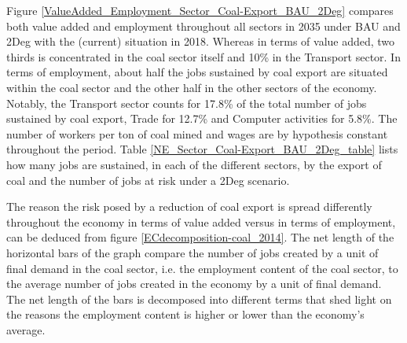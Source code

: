 \documentclass[12pt,english]{article}
\begin{document}

Figure \ref{ValueAdded_Employment_Sector_Coal-Export_BAU_2Deg} %
compares both value added and employment throughout all sectors in 2035 under BAU and 2Deg with the (current) situation in 2018. Whereas in terms of value added, two thirds is concentrated in the coal sector itself and 10\% in the Transport sector. In terms of employment, about half the jobs sustained by coal export are situated within the coal sector and the other half in the other sectors of the economy. Notably, the Transport sector counts for 17.8\% of the total number of jobs sustained by coal export, Trade for 12.7\% and Computer activities for 5.8\%. The number of workers per ton of coal mined and wages are by hypothesis constant throughout the period. Table \ref{NE_Sector_Coal-Export_BAU_2Deg_table}
lists how many jobs are sustained, in each of the different sectors, by the export of coal and the number of jobs at risk under a 2Deg scenario.

The reason the risk posed by a reduction of coal export is spread differently throughout the economy in terms of value added versus in terms of employment, can be deduced from figure \ref{ECdecomposition-coal_2014}. The net length of the horizontal bars of the graph compare the number of jobs created by a unit of final demand in the coal sector, i.e. the employment content of the coal sector, to the average number of jobs created in the economy by a unit of final demand. The net length of the bars is decomposed into different terms that shed light on the reasons the employment content is higher or lower than the economy's average.
\end{document}

